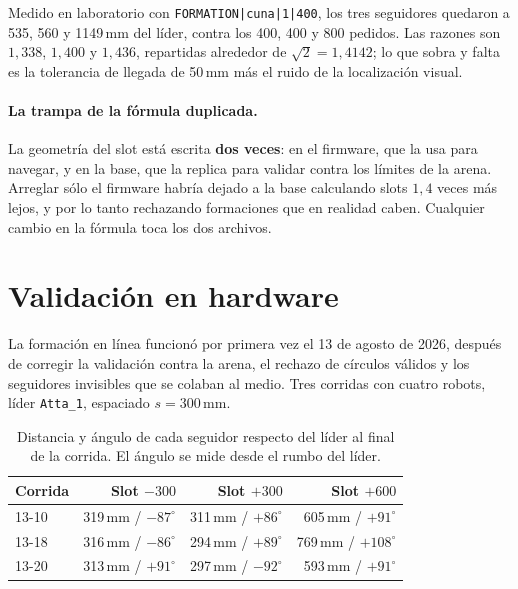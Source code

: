 \documentclass[11pt,a4paper]{article}
\theoremstyle{plain}
\newcommand{\cmd}[1]{\texttt{#1}}
\begin{document}
Medido en laboratorio con \cmd{FORMATION|cuna|1|400}, los tres seguidores
quedaron a 535, 560 y 1149\,mm del líder, contra los 400, 400 y 800 pedidos.
Las razones son $1{,}338$, $1{,}400$ y $1{,}436$, repartidas alrededor de
$\sqrt{2} = 1{,}4142$; lo que sobra y falta es la tolerancia de llegada de
50\,mm más el ruido de la localización visual.

\paragraph{La trampa de la fórmula duplicada.}
La geometría del slot está escrita \textbf{dos veces}: en el firmware, que la
usa para navegar, y en la base, que la replica para validar contra los límites
de la arena. Arreglar sólo el firmware habría dejado a la base calculando slots
$1{,}4$ veces más lejos, y por lo tanto rechazando formaciones que en realidad
caben. Cualquier cambio en la fórmula toca los dos archivos.

\section{Validación en hardware}

La formación en línea funcionó por primera vez el 13 de agosto de 2026, después
de corregir la validación contra la arena, el rechazo de círculos válidos y los
seguidores invisibles que se colaban al medio. Tres corridas con cuatro robots,
líder \cmd{Atta\_1}, espaciado $s = 300$\,mm.

\begin{table}[H]
\centering
\begin{tabular}{@{}lrrr@{}}
  \toprule
  Corrida & Slot $-300$ & Slot $+300$ & Slot $+600$ \\
  \midrule
  13-10 & 319\,mm / $-87^\circ$ & 311\,mm / $+86^\circ$
        & 605\,mm / $+91^\circ$ \\
  13-18 & 316\,mm / $-86^\circ$ & 294\,mm / $+89^\circ$
        & \textcolor{colwrong}{769\,mm / $+108^\circ$} \\
  13-20 & 313\,mm / $+91^\circ$ & 297\,mm / $-92^\circ$
        & \textcolor{colsteel}{593\,mm / $+91^\circ$} \\
  \bottomrule
\end{tabular}
\caption{Distancia y ángulo de cada seguidor respecto del líder al final de la
corrida. El ángulo se mide desde el rumbo del líder.}
\label{tab:validacion}
\end{table}
\end{document}
